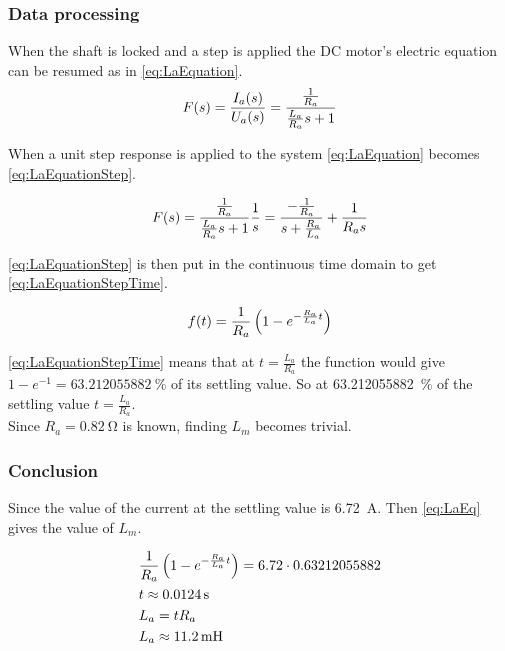 \subsubsection*{Data processing}
When the shaft is locked and a step is applied the DC motor's electric equation can be resumed as in \autoref{eq:LaEquation}.
\begin{equation}
	F(s)=\frac{I_a(s)}{U_a(s)}=\frac{\frac{1}{R_a}}{\frac{L_a}{R_a} s+1} \addunit{1}
	\label{eq:LaEquation}
\end{equation}
\startexplain
{}
\stopexplain

When a unit step response is applied to the system \autoref{eq:LaEquation} becomes \autoref{eq:LaEquationStep}.

\begin{equation}
F(s)=\frac{\frac{1}{R_a}}{\frac{L_a}{R_a} s+1}\frac{1}{s}=\frac{-\frac{1}{R_a}}{s+\frac{R_a}{L_a}}+\frac{1}{R_a s} \addunit{1}
\label{eq:LaEquationStep}
\end{equation}

\autoref{eq:LaEquationStep} is then put in the continuous time domain to get \autoref{eq:LaEquationStepTime}.

\begin{equation}
f(t)= \frac{1}{R_a} \left(1-e^{-\frac{R_a}{L_a} t}\right) \addunit{1}
\label{eq:LaEquationStepTime}
\end{equation}

\autoref{eq:LaEquationStepTime} means that at $t=\frac{L_a}{R_a}$ the function would give $1-e^{-1}=\SI{63.212055882}{\percent}$ of its settling value. So at \SI{63.212055882}{\percent} of the settling value $t=\frac{L_a}{R_a}$. \\
Since $R_a=\SI{0.82}{\ohm}$ is known, finding $L_m$ becomes trivial.

\subsubsection*{Conclusion}

Since the value of the current at the settling value is \SI{6.72}{\ampere}. Then \autoref{eq:LaEq} gives the value of $L_m$.

\begin{subequations} \label{eq:LaEq}
	\begin{flalign}
		&\frac{1}{R_a} \left(1-e^{-\frac{R_a}{L_a} t}\right)=6.72 \cdot 0.63212055882 \addunit{\second} \\
		&t \approx \SI{0.0124}{\second} \\
		&L_a=tR_a \\
		&L_a \approx \SI{11.2}{\milli\henry}
	\end{flalign}
\end{subequations}

